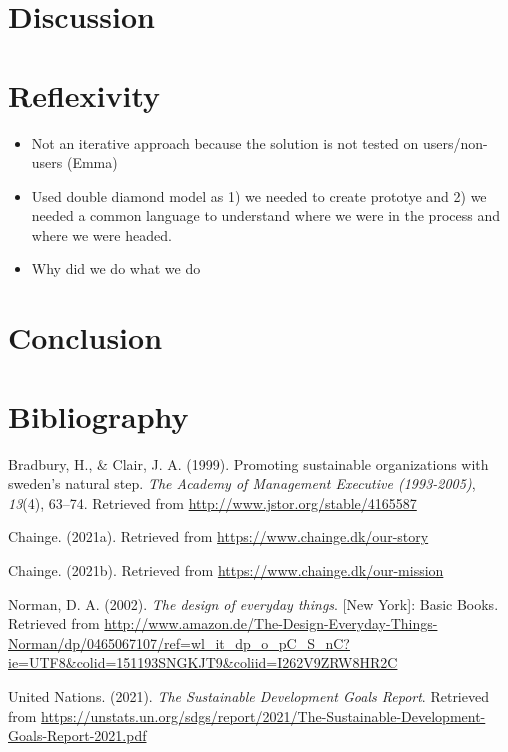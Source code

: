 \hypertarget{sec:discussion}{%
\section{Discussion}\label{sec:discussion}}

\hypertarget{sec:reflexivity}{%
\section{Reflexivity}\label{sec:reflexivity}}

\begin{itemize}
\tightlist
\item
  Not an iterative approach because the solution is not tested on
  users/non-users (Emma)
\item
  Used double diamond model as 1) we needed to create prototye and 2) we
  needed a common language to understand where we were in the process
  and where we were headed.
\item
  Why did we do what we do
\end{itemize}

\hypertarget{sec:conclusion}{%
\section{Conclusion}\label{sec:conclusion}}

\newpage

\hypertarget{sec:bibliography}{%
\section{Bibliography}\label{sec:bibliography}}

\addvspace{0.5cm}

\hypertarget{refs}{}
\begin{CSLReferences}{1}{0}
\leavevmode{}%
Bradbury, H., \& Clair, J. A. (1999). Promoting sustainable
organizations with sweden's natural step. \emph{The Academy of
Management Executive (1993-2005)}, \emph{13}(4), 63--74. Retrieved from
\url{http://www.jstor.org/stable/4165587}

\leavevmode{}%
Chainge. (2021a). Retrieved from \url{https://www.chainge.dk/our-story}

\leavevmode{}%
Chainge. (2021b). Retrieved from
\url{https://www.chainge.dk/our-mission}

\leavevmode{}%
Norman, D. A. (2002). \emph{The design of everyday things}. {[}New
York{]}: Basic Books. Retrieved from
\url{http://www.amazon.de/The-Design-Everyday-Things-Norman/dp/0465067107/ref=wl_it_dp_o_pC_S_nC?ie=UTF8\&colid=151193SNGKJT9\&coliid=I262V9ZRW8HR2C}

\leavevmode{}%
United Nations. (2021). \emph{The {Sustainable} {Development} {Goals}
{Report}}. Retrieved from
\url{https://unstats.un.org/sdgs/report/2021/The-Sustainable-Development-Goals-Report-2021.pdf}

\end{CSLReferences}

